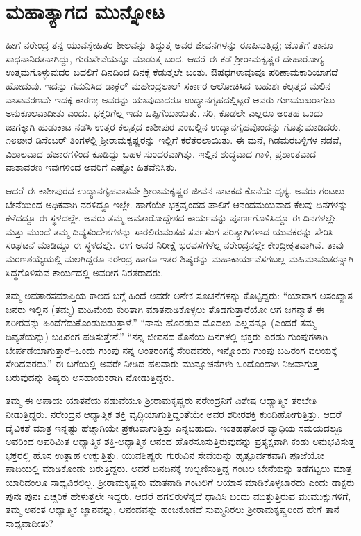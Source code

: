 
\chapter{ಮಹಾತ್ಯಾಗದ ಮುನ್ನೋಟ}

ಹೀಗೆ ನರೇಂದ್ರ ತನ್ನ ಯುವಸ್ನೇಹಿತರ ಶೀಲವನ್ನು ತಿದ್ದುತ್ತ ಅವರ ಜೀವನಗಳನ್ನು ರೂಪಿಸುತ್ತಿದ್ದ; ಜೊತೆಗೆ ತಾನೂ ಸಾಧನಾನಿರತನಾಗಿದ್ದು, ಗುರುಸೇವೆಯನ್ನೂ ಮಾಡುತ್ತ ಬಂದ. ಆದರೆ ಈ ಕಡೆ ಶ್ರೀರಾಮಕೃಷ್ಣರ ದೇಹಾರೋಗ್ಯ ಉತ್ತಮಗೊಳ್ಳುವುದರ ಬದಲಿಗೆ ದಿನದಿಂದ ದಿನಕ್ಕೆ ಕೆಡುತ್ತಲೇ ಬಂತು. ಔಷಧಗಳಾವೂವೂ ಪರಿಣಾಮಕಾರಿಯಾಗದೆ ಹೋದುವು. ಇದನ್ನು ಗಮನಿಸಿದ ಡಾಕ್ಟರ್ ಮಹೇಂದ್ರಲಾಲ್ ಸರ್ಕಾರ ಆಲೋಚಿಸಿದ–ಬಹುಶಃ ಕಲ್ಕತ್ತದ ಮಲಿನ ವಾತಾವರಣವೇ ಇದಕ್ಕೆ ಕಾರಣ; ಅವರನ್ನು ಯಾವುದಾದರೂ ಉದ್ಯಾನಗೃಹದಲ್ಲಿಟ್ಟರೆ ಅವರು ಗುಣಮುಖರಾಗಲು ಅನುಕೂಲವಾದೀತು ಎಂದು. ಭಕ್ತರಿಗೆಲ್ಲ ಇದು ಒಪ್ಪಿಗೆಯಾಯಿತು. ಸರಿ, ಕೂಡಲೇ ಎಲ್ಲರೂ ಅಂತಹ ಒಂದು ಜಾಗಕ್ಕಾಗಿ ಹುಡುಕಾಟ ನಡೆಸಿ ಉತ್ತರ ಕಲ್ಕತ್ತದ ಕಾಶೀಪುರ ಎಂಬಲ್ಲಿನ ಉದ್ಯಾನಗೃಹವೊಂದನ್ನು ಗೊತ್ತುಮಾಡಿದರು. ೧೮೮೫ರ ಡಿಸೆಂಬರ್ ತಿಂಗಳಲ್ಲಿ ಶ್ರೀರಾಮಕೃಷ್ಣರನ್ನು ಇಲ್ಲಿಗೆ ಕರೆತೆರಲಾಯಿತು. ಈ ಮನೆ, ಗಿಡಮರಬಳ್ಳಿಗಳ ನಡವೆ, ವಿಶಾಲವಾದ ಹಜಾರಗಳಿಂದ ಕೂಡಿದ್ದು ಬಹಳ ಸುಂದರವಾಗಿತ್ತು. ಇಲ್ಲಿನ ಶುದ್ಧವಾದ ಗಾಳಿ, ಪ್ರಶಾಂತವಾದ ವಾತಾವರಣ ಇವುಗಳಿಂದ ಅವರಿಗೆ ಎಷ್ಟೋ ಹಿತವೆನಿಸಿತು.

ಆದರೆ ಈ ಕಾಶೀಪುರದ ಉದ್ಯಾನಗೃಹವಾಸವೇ ಶ್ರೀರಾಮಕೃಷ್ಣರ ಜೀವನ ನಾಟಕದ ಕೊನೆಯ ದೃಶ್ಯ. ಅವರು ಗಂಟಲು ಬೇನೆಯಿಂದ ಅಧಿಕವಾಗಿ ನರಳಿದ್ದೂ ಇಲ್ಲೇ. ಹಾಗೆಯೇ ಭಕ್ತವೃಂದದ ಪಾಲಿಗೆ ಆನಂದಮಯವಾದ ಕೆಲವು ದಿನಗಳನ್ನು ಕಳೆದದ್ದೂ ಈ ಸ್ಥಳದಲ್ಲೇ. ಅವರು ತಮ್ಮ ಅವತಾರೋದ್ದೇಶದ ಕಾರ್ಯವನ್ನು ಪೂರ್ಣಗೊಳಿಸಿದ್ದೂ ಈ ದಿನಗಳಲ್ಲೇ. ಮತ್ತು ಮುಂದೆ ತಮ್ಮ ದಿವ್ಯಸಂದೇಶಗಳನ್ನು ಸಾರಲಿರುವಂತಹ ಸರ್ವಸಂಗ ಪರಿತ್ಯಾಗಿಗಳಾದ ಯುವಕರನ್ನು ಸೇರಿಸಿ ಸಂಘಟನೆ ಮಾಡಿದ್ದೂ ಈ ಸ್ಥಳದಲ್ಲೇ. ಈಗ ಅವರ ನಿರೀಕ್ಷೆ-ಭರವಸೆಗಳೆಲ್ಲ ನರೇಂದ್ರನಲ್ಲೇ ಕೇಂದ್ರೀಕೃತವಾಗಿವೆ. ತಾವು ಮರಣಶಯ್ಯೆಯಲ್ಲಿ ಮಲಗಿದ್ದರೂ ನರೇಂದ್ರ ಹಾಗೂ ಇತರ ಶಿಷ್ಯರನ್ನು ಮಹಾಕಾರ್ಯವೆಸಗಬಲ್ಲ ಮಹಿಮಾವಂತರನ್ನಾಗಿ ಸಿದ್ಧಗೊಳಿಸುವ ಕಾರ್ಯದಲ್ಲಿ ಅವರೀಗ ನಿರತರಾದರು.

ತಮ್ಮ ಅವತಾರಸಮಾಪ್ತಿಯ ಕಾಲದ ಬಗ್ಗೆ ಹಿಂದೆ ಅವರೇ ಅನೇಕ ಸೂಚನೆಗಳನ್ನು ಕೊಟ್ಟಿದ್ದರು: “ಯಾವಾಗ ಅಸಂಖ್ಯಾತ ಜನರು ಇಲ್ಲಿನ (ತಮ್ಮ) ಮಹಿಮೆಯ ಕುರಿತಾಗಿ ಮಾತನಾಡಿಕೊಳ್ಳಲು ತೊಡಗುತ್ತಾರೆಯೋ ಆಗ ಜಗನ್ಮಾತೆ ಈ ಶರೀರವನ್ನು ಹಿಂದೆಗೆದುಕೊಂಡುಬಿಡುತ್ತಾಳೆ.” “ನಾನು ಹೊರಡುವ ಮೊದಲು ಎಲ್ಲವನ್ನೂ (ಎಂದರೆ ತಮ್ಮ ದಿವ್ಯತೆಯನ್ನು) ಬಹಿರಂಗ ಪಡಿಸುತ್ತೇನೆ.” “ನನ್ನ ಜೀವನದ ಕೊನೆಯ ದಿನಗಳಲ್ಲಿ ಭಕ್ತರು ಎರಡು ಗುಂಪುಗಳಾಗಿ ಬೇರ್ಪಡೆಯಾಗುತ್ತಾರೆ–ಒಂದು ಗುಂಪು ನನ್ನ ಅಂತರಂಗಕ್ಕೆ ಸೇರಿದವರು, ಇನ್ನೊಂದು ಗುಂಪು ಬಹಿರಂಗ ವಲಯಕ್ಕೆ ಸೇರಿದವರದು.” ಈ ಬಗೆಯಲ್ಲಿ ಅವರೇ ನೀಡಿದ ಹಲವಾರು ಮುನ್ಸೂಚನೆಗಳು ಒಂದೊಂದಾಗಿ ನಿಜವಾಗುತ್ತ ಬರುವುದನ್ನು ಶಿಷ್ಯರು ಅಸಹಾಯಕರಾಗಿ ನೋಡುತ್ತಿದ್ದರು.

ತಮ್ಮ ಈ ಅಪಾಯ ಯಾತನೆಯ ನಡುವೆಯೂ ಶ್ರೀರಾಮಕೃಷ್ಣರು ನರೇಂದ್ರನಿಗೆ ವಿಶೇಷ ಆಧ್ಯಾತ್ಮಿಕ ತರಬೇತಿ ನೀಡುತ್ತಿದ್ದರು. ನರೇಂದ್ರನ ಆಧ್ಯಾತ್ಮಿಕ ಶಕ್ತಿ ವೃದ್ಧಿಯಾಗುತ್ತಿದ್ದಂತೆಯೇ ಅವರ ಶರೀರಶಕ್ತಿ ಕುಂದಿಹೋಗುತ್ತಿತ್ತು. ಆದರೆ ದೈವಿಕತೆ ಮಾತ್ರ ಇನ್ನಷ್ಟು ಹೆಚ್ಚಾಗಿಯೇ ಪ್ರಕಟವಾಗುತ್ತಿತ್ತು ಎನ್ನಬಹುದು. ಇಂತಹಘೋರ ವ್ಯಾಧಿಯ ಸಮಯದಲ್ಲೂ ಅವರಿಂದ ಅಪರಿಮಿತ ಆಧ್ಯಾತ್ಮಿಕ ಶಕ್ತಿ-ಆಧ್ಯಾತ್ಮಿಕ ಆನಂದ ಹೊರಸೂಸುತ್ತಿರುವುದನ್ನು ಪ್ರತ್ಯಕ್ಷವಾಗಿ ಕಂಡು ಅನುಭವಿಸುತ್ತ ಭಕ್ತರಲ್ಲಿ ಹೊಸ ಉತ್ಸಾಹ ಉಕ್ಕುತ್ತಿತ್ತು. ಯುವಶಿಷ್ಯರು ಗುರುವಿನ ಸೇವೆಯನ್ನು ಹೃತ್ಪೂರ್ವಕವಾಗಿ ಪೂಜೆಯೋ ಪಾದಿಯಲ್ಲಿ ಮಾಡಿಕೊಂಡು ಬರುತ್ತಿದ್ದರು. ಆದರೆ ದಿನದಿನಕ್ಕೆ ಉಲ್ಬಣಿಸುತ್ತಿದ್ದ ಗಂಟಲ ಬೇನೆಯನ್ನು ತಡೆಗಟ್ಟಲು ಮಾತ್ರ ಯಾರಿದಂಲೂ ಸಾಧ್ಯವಿರಲಿಲ್ಲ. ಶ್ರೀರಾಮಕೃಷ್ಣರು ಮಾತನಾಡಿ ಗಂಟಲಿಗೆ ಆಯಾಸ ಮಾಡಿಕೊಳ್ಳಬಾರದು ಎಂದು ಡಾಕ್ಟರು ಪುನಃ ಪುನಃ ಎಚ್ಚರಿಕೆ ಹೇಳುತ್ತಲೇ ಇದ್ದರು. ಆದರೆ ಹಗಲಿರುಳೆನ್ನದೆ ಧಾವಿಸಿ ಬಂದು ಮುತ್ತುತ್ತಿರುವ ಮುಮುಕ್ಷುಗಳಿಗೆ, ತಮ್ಮ ಅನಂತ ಆಧ್ಯಾತ್ಮಿಕ ಜ್ಞಾನವನ್ನು, ಆನಂದವನ್ನು ಹಂಚಿಕೊಡದೆ ಸುಮ್ಮನಿರಲು ಶ್ರೀರಾಮಕೃಷ್ಣರಿಂದ ಹೇಗೆ ತಾನೆ ಸಾಧ್ಯವಾದೀತು?

